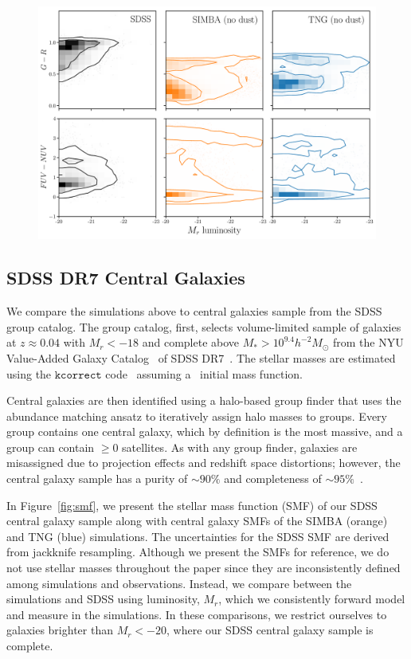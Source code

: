 \begin{figure}
\begin{center}
\includegraphics[width=\textwidth]{figs/observables.pdf} 
    \caption{}
\label{fig:obs}
\end{center}
\end{figure}


\subsection{SDSS DR7 Central Galaxies} \label{sec:obs} 
We compare the simulations above to central galaxies sample from the \cite{tinker2011} SDSS group catalog. The
\cite{tinker2011} group catalog, first, selects volume-limited sample of galaxies 
at $z \approx 0.04$ with $M_r < -18$ and complete above $M_* > 10^{9.4}
h^{-2}M_\odot$ from the NYU Value-Added Galaxy Catalog~\citep[VAGC;][]{blanton2005} 
of SDSS DR7~\citep{abazajian2009}. The stellar masses are estimated using the
$\mathtt{kcorrect}$ code~\citep{blanton2007a} assuming a~\cite{chabrier2003}
initial mass function.

Central galaxies are then identified using a halo-based group finder that uses
the abundance matching ansatz to iteratively  assign halo masses to groups.
Every group contains one central galaxy, which by definition is the most
massive, and a group can contain $\ge0$ satellites. As with any group finder,
galaxies are misassigned due to projection effects and redshift space
distortions; however, the central galaxy sample has a purity of ${\sim}90\%$
and completeness of ${\sim}95\%$~\citep{tinker2018}. 

In Figure~\ref{fig:smf}, we present the stellar mass function (SMF) of our SDSS
central galaxy sample along with central galaxy SMFs of the SIMBA (orange) and
TNG (blue) simulations. The uncertainties for the SDSS SMF are derived from
jackknife resampling. Although we present the SMFs for reference, we do not use
stellar masses throughout the paper since they are inconsistently defined among
simulations and observations. Instead, we compare between the simulations and
SDSS using luminosity, $M_r$, which we consistently forward model and measure
in the simulations. In these comparisons, we restrict ourselves to galaxies
brighter than $M_r < -20$, where our SDSS central galaxy sample is complete. 

